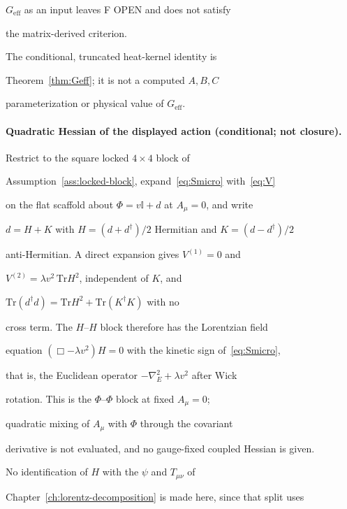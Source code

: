 \(G_{\mathrm{eff}}\) as an input leaves F OPEN and does not satisfy

the matrix-derived criterion.



The conditional, truncated heat-kernel identity is

Theorem~\ref{thm:Geff}; it is not a computed \(A,B,C\)

parameterization or physical value of \(G_{\mathrm{eff}}\).





\paragraph{Quadratic Hessian of the displayed action (conditional; not closure).} \label{detail:sec-F-paragraphquadratichessianofthe-22}

Restrict to the square locked \(4\times4\) block of

Assumption~\ref{ass:locked-block}, expand~\eqref{eq:Smicro} with~\eqref{eq:V}

on the flat scaffold about \(\Phi=v\mathbb I+d\) at \(A_\mu=0\), and write

\(d=H+K\) with \(H=(d+d^\dagger)/2\) Hermitian and \(K=(d-d^\dagger)/2\)

anti-Hermitian. A direct expansion gives \(V^{(1)}=0\) and

\(V^{(2)}=\lambda v^2\,\mathrm{Tr}H^2\), independent of \(K\), and

\(\mathrm{Tr}(d^\dagger d)=\mathrm{Tr}H^2+\mathrm{Tr}(K^\dagger K)\) with no

cross term. The \(H\)--\(H\) block therefore has the Lorentzian field

equation \((\Box-\lambda v^2)H=0\) with the kinetic sign of~\eqref{eq:Smicro},

that is, the Euclidean operator \(-\nabla_E^2+\lambda v^2\) after Wick

rotation. This is the \(\Phi\)--\(\Phi\) block at fixed \(A_\mu=0\);

quadratic mixing of \(A_\mu\) with \(\Phi\) through the covariant

derivative is not evaluated, and no gauge-fixed coupled Hessian is given.

No identification of \(H\) with the \(\psi\) and \(T_{\mu\nu}\) of

Chapter~\ref{ch:lorentz-decomposition} is made here, since that split uses

